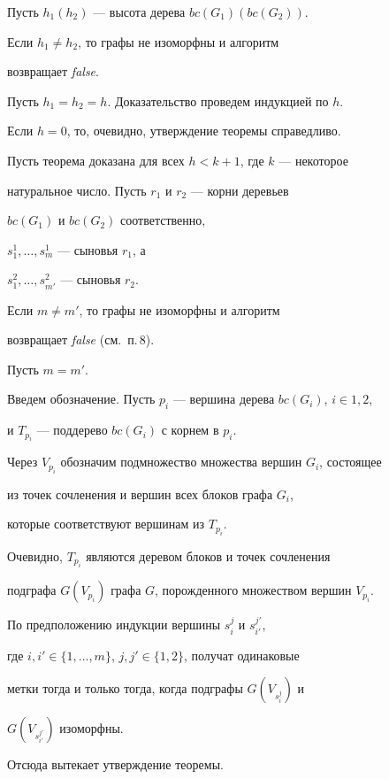 \begin{pf}


Пусть $h_1(h_2)$ --- высота дерева $bc(G_1)(bc(G_2))$.


Если $h_1\ne h_2$, то графы не изоморфны и алгоритм


возвращает {\it false}.





Пусть $h_1=h_2=h$. Доказательство проведем индукцией по $h$.


Если $h=0$, то, очевидно, утверждение теоремы справедливо.


Пусть теорема доказана для всех $h<k+1$, где $k$ --- некоторое


натуральное число. Пусть $r_1$ и $r_2$ --- корни деревьев


$bc(G_1)$ и $bc(G_2)$ соответственно,


$s_1^1,\dotsc, s_m^1$ --- сыновья $r_1$, а


$s_1^2,\dotsc, s_{m'}^2$ --- сыновья $r_2$.


Если $m\ne m'$, то графы не изоморфны и алгоритм


возвращает {\it false} (см.~п.\,8).


Пусть $m=m'$.





Введем обозначение. Пусть $p_i$ --- вершина дерева $bc(G_i)$, $i\in {1,2}$,


и $T_{p_i}$ --- поддерево $bc(G_i)$ с корнем в $p_i$.


Через $V_{p_i}$ обозначим подмножество множества вершин $G_i$, состоящее


из точек сочленения и вершин всех блоков графа $G_i$,


которые соответствуют вершинам из $T_{p_i}$.


Очевидно, $T_{p_i}$ являются деревом блоков и точек сочленения


подграфа $G(V_{p_i})$ графа $G$, порожденного множеством вершин $V_{p_i}$.





По предположению индукции вершины $s_i^j$ и $s_{i'}^{j'}$,


где $i, i'\in \{1,\dotsc, m\}$, $j, j'\in \{1, 2\}$, получат одинаковые


метки тогда и только тогда, когда подграфы $G(V_{s_i^j})$ и


$G(V_{s_{i'}^{j'}})$ изоморфны.


Отсюда вытекает утверждение теоремы.


\end{pf}





